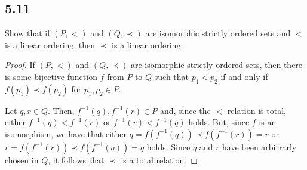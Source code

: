 \subsection*{5.11} Show that if $(P,<)$ and $(Q,\prec)$ are isomorphic strictly ordered sets and $<$ is a linear ordering, then $\prec$ is a linear ordering.

\begin{proof}
If $(P,<)$ and $(Q,\prec)$ are isomorphic strictly ordered sets, then there is some bijective function $f$ from $P$ to $Q$ such that $p_1 < p_2$  if and only if $f(p_1) \prec f(p_2)$ for $p_1, p_2 \in P$. 

Let $q,r \in Q$. Then, $f^{-1}(q), f^{-1}(r) \in P$ and, since the $<$ relation is total, either $f^{-1}(q) < f^{-1}(r)$ or $f^{-1}(r) < f^{-1}(q)$ holds. But, since $f$ is an isomorphism, we have that either  $q = f(f^{-1}(q)) \prec f(f^{-1}(r)) = r$ or $r = f(f^{-1}(r)) \prec f(f^{-1}(q)) = q$ holds. Since $q$ and $r$ have been arbitrarly chosen in $Q$, it follows that $\prec$ is a total relation.

\end{proof}

